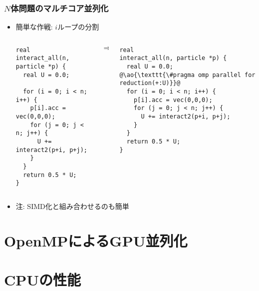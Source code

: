 \documentclass[10pt,dvipdfmx]{beamer}
\newcommand{\ao}[1]{{\color{blue}#1}}
\begin{document}
\begin{frame}[fragile]
\frametitle{$N$体問題のマルチコア並列化}
\begin{itemize}
\item 簡単な作戦: $i$ループの分割

\begin{columns}
\begin{column}{0.48\textwidth}
\begin{lstlisting}
real
interact_all(n, particle *p) {
  real U = 0.0;

  for (i = 0; i < n; i++) {
    p[i].acc = vec(0,0,0);
    for (j = 0; j < n; j++) {
      U += interact2(p+i, p+j);
    }
  }
  return 0.5 * U;
}
\end{lstlisting}
\end{column}
\begin{column}{0.05\textwidth}
$\Rightarrow$
\end{column}
\begin{column}{0.48\textwidth}
\begin{lstlisting}
real
interact_all(n, particle *p) {
  real U = 0.0;
@\ao{\texttt{\#pragma omp parallel for reduction(+:U)}}@
  for (i = 0; i < n; i++) {
    p[i].acc = vec(0,0,0);
    for (j = 0; j < n; j++) {
      U += interact2(p+i, p+j);
    }
  }
  return 0.5 * U;
}
\end{lstlisting}
\end{column}
\end{columns}
\item [] 注: SIMD化と組み合わせるのも簡単
\end{itemize}
\end{frame}


\section{OpenMPによるGPU並列化}



\section{CPUの性能}
\end{document}
